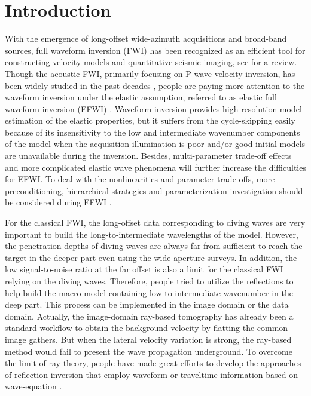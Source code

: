 \section{Introduction}
With the emergence of long-offset wide-azimuth acquisitions and broad-band sources,
full waveform inversion (FWI) has been recognized as an
efficient tool for constructing velocity models and quantitative seismic imaging, see
\cite{virieux2009overview} for a review.
Though the acoustic FWI, primarily focusing on P-wave velocity inversion, has been
widely studied in the past decades
\cite[]{tarantola1984,pratt1998gauss,shipp:2002}, people are paying more attention
to the waveform inversion under the elastic assumption, referred to as elastic full waveform inversion
(EFWI) \cite[]{tarantola1986}.
Waveform inversion provides high-resolution model estimation of the elastic
properties, but it
suffers from the cycle-skipping easily because of its insensitivity to the low and intermediate wavenumber components of the model
when the acquisition illumination is poor and/or good initial models are unavailable during the inversion\cite[]{sears2008,brossier2009}. 
Besides, multi-parameter trade-off effects and more complicated elastic wave phenomena 
will further increase the difficulties for EFWI.
To deal with the nonlinearities and parameter trade-offs, more
preconditioning, hierarchical strategies and parameterization investigation should be
considered during EFWI 
\cite[]{sears2008,prieux:2013b,operto2013guided,wang:2015,Oh2016}.

For the classical FWI, the long-offset data
corresponding to diving waves are very important to build the long-to-intermediate
wavelengths of the model. However, the penetration depths of
diving waves are always far from sufficient to reach the target in the deeper part
even using the wide-aperture surveys. 
In addition, the low signal-to-noise ratio at the far
offset is also a limit for the classical FWI relying on the diving waves. 
Therefore, people tried to utilize the reflections
to help build the macro-model containing low-to-intermediate wavenumber
in the deep part\cite[]{Stork1992,ChaventEtAl1994,clement:2001,Symes2008a,xu:2012}.
This process can be implemented in the image domain or the data domain. 
Actually, the image-domain ray-based tomography
\cite[]{Stork1992,Woodward1992,Woodward2008,Jones2010} has already been a standard workflow to obtain the background velocity by flatting the common
image gathers. But when the lateral velocity variation is strong, the ray-based method would fail to
present the wave propagation underground.
To overcome the limit of ray theory, 
people have made great efforts to develop the approaches of reflection inversion that employ
waveform or traveltime information based on wave-equation
\cite[]{xu:2012,Ma2013,Wu2015b,Zhou2015,Wang2015,Chi2015}.

